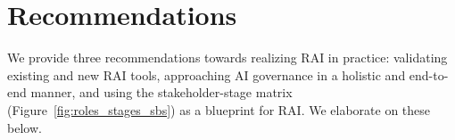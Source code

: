 \section{Recommendations}
We provide three recommendations towards realizing RAI in practice: validating existing and new RAI tools, approaching AI governance in a holistic and end-to-end manner, and using the stakeholder-stage matrix (Figure~\ref{fig:roles_stages_sbs}) as a blueprint for RAI.
We elaborate on these below.

